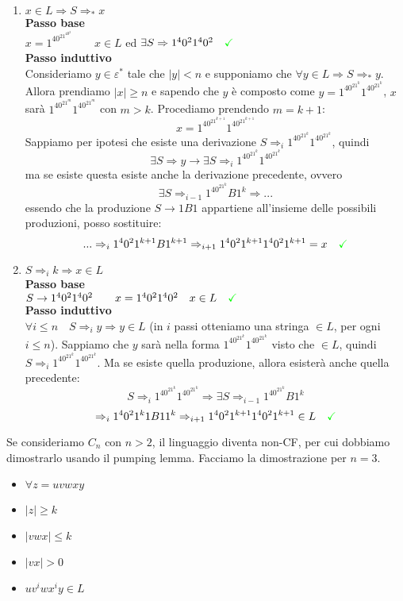 \documentclass[a4paper,oneside]{scrbook}
\newcommand{\greenmark}{\quad \textcolor{green}{\checkmark}}
\begin{document}
\begin{enumerate}
	\item $x\in L \Rightarrow S \Rightarrow_* x $\\
	\textbf{Passo base}\\
	$x=1^40^21^40^2 \qquad x \in L$ ed $\exists S\Rightarrow 1^40^21^40^2 \greenmark $\\
	\textbf{Passo induttivo}\\
	Consideriamo $y \in \varepsilon^*$ tale che $|y|<n$ e supponiamo che $\forall y \in L \Rightarrow S \Rightarrow_* y$.\\
	Allora prendiamo $|x|\geq n$ e sapendo che $y$ è composto come $y=1^40^21^k1^40^21^k$, $x$ sarà $1^40^21^m1^40^21^m$ con $m>k$. Procediamo prendendo $m=k+1$:
	$$ x=1^40^21^{k+1}1^40^21^{k+1}$$
	Sappiamo per ipotesi che esiste una derivazione  $S\Rightarrow_i 1^40^21^k1^40^21^k$, quindi
	$$\exists S \Rightarrow y \rightarrow \exists S \Rightarrow_i 1^40^21^k1^40^21^k$$
	ma se esiste questa esiste anche la derivazione precedente, ovvero
	$$\exists S \Rightarrow_{i-1} 1^40^21^{k}B1^{k} \Rightarrow ...$$
	essendo che la produzione $S\rightarrow 1B1$ appartiene all'insieme delle possibili produzioni, posso sostituire:
	$$... \Rightarrow_i  1^40^21^{k+1}B1^{k+1} \Rightarrow_{i+1}  1^40^21^{k+1}1^40^21^{k+1} = x \greenmark$$
	
	\item $ S \Rightarrow_i k \Rightarrow x \in L$\\
	\textbf{Passo base}\\
	$S\rightarrow 1^40^21^40^2 \qquad x=1^40^21^40^2 \quad x \in L \greenmark $\\
	\textbf{Passo induttivo}\\
	$\forall i \leq n \quad S \Rightarrow_i y \Rightarrow y \in L $ (in $i$ passi otteniamo una stringa $\in L$, per ogni $i\leq n$).
	Sappiamo che $y$ sarà nella forma $1^40^21^k1^40^21^k$ visto che $\in L$, quindi $S \Rightarrow_i 1^40^21^k1^40^21^k$.
	Ma se esiste quella produzione, allora esisterà anche quella precedente:
	$$S \Rightarrow_i 1^40^21^k1^40^21^k \Rightarrow \exists S \Rightarrow_{i-1} 1^40^21^kB1^k$$
	$$\Rightarrow_i 1^40^21^k1B11^k \Rightarrow_{i+1} 1^40^21^{k+1}1^40^21^{k+1} \in L \greenmark$$
\end{enumerate}
Se consideriamo $C_n$ con $n>2$, il linguaggio diventa non-CF, per cui dobbiamo dimostrarlo usando il pumping lemma. Facciamo la dimostrazione per $n=3$.
\begin{itemize}
	\item $\forall z = uvwxy$
	\item $|z| \geq k$
	\item $|vwx| \leq k$
	\item $|vx|>0$
	\item $uv^iwx^iy\in L$
\end{itemize}
\end{document}
